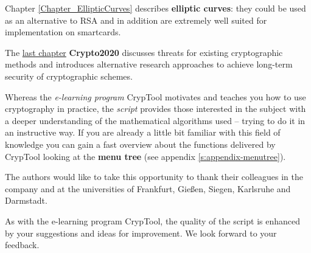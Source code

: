 Chapter \ref{Chapter_EllipticCurves} describes {\bf elliptic curves}:
they could be used as an alternative to RSA and in addition are extremely
well suited for implementation on smartcards.

The \hyperlink{Chapter_Crypto2020}{last chapter} {\bf Crypto2020}
discusses threats for existing cryptographic methods and introduces
alternative research approaches to achieve long-term security
of cryptographic schemes.

Whereas the \textit{e-learning program} CrypTool motivates and
teaches you how to use cryptography in practice, the \textit{script} provides
those interested in the subject with a deeper understanding of the mathematical
algorithms used -- trying to do it in an instructive way.
If you are already a little bit familiar with this field of knowledge you can
gain a fast overview about the functions delivered by CrypTool looking at the
{\bf menu tree} (see appendix \ref{s:appendix-menutree}).

The authors would like to take this opportunity to thank their colleagues 
in the company and at the universities of Frankfurt, Gie\ss en, 
Siegen, Karlsruhe and Darmstadt.

\enlargethispage{12pt}
As with the e-learning program CrypTool, the quality of the 
script is enhanced by your suggestions and ideas for improvement. 
We look forward to your feedback.


